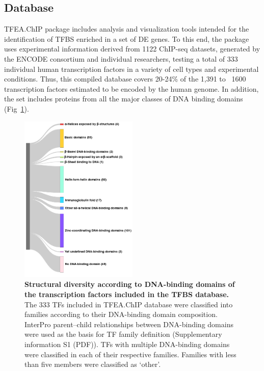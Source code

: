 \documentclass[10pt,letterpaper]{article}
\begin{document}
	\subsection*{Database}
	TFEA.ChIP package includes analysis and visualization tools intended for the identification of TFBS enriched in a set of DE genes. To this end, the package uses experimental information derived from 1122 ChIP-seq datasets, generated by the ENCODE consortium and individual researchers, testing a total of 333 individual human transcription factors in a variety of cell types and experimental conditions. Thus, this compiled database covers 20-24\% of the 1,391\cite{TFcensus} to ~1600 \cite{Lambert2018} transcription factors estimated to be encoded by the human genome. In addition, the set includes proteins from all the major classes of DNA binding domains (Fig~\ref{fig1}).
	
	
	\begin{figure}[!h]
		\centering
		\includegraphics[width=0.5\textwidth]{superclases}
		\caption{{\bf Structural diversity according to DNA-binding domains of the transcription factors included in the TFBS database.} The 333 TFs included in TFEA.ChIP database were classified into families according to their DNA-binding domain composition. InterPro parent–child relationships between DNA-binding domains were used as the basis for TF family definition (Supplementary information S1 (PDF)). TFs with multiple DNA-binding domains were classified in each of their respective families. Families with less than five members were classified as ‘other’.}
		\label{fig1}
	\end{figure} 
	
\end{document}
